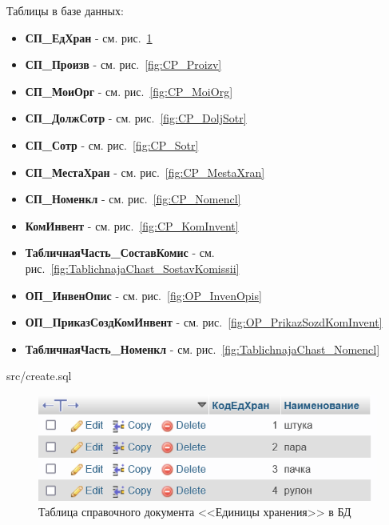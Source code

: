 \documentclass[12pt, a4paper, simple]{eskdtext}
\begin{document}
    

    \thispagestyle{plain}
    \pagestyle{plain}
    \hspace{0pt}

    Таблицы в базе данных:
    \begin{itemize}
        \item \textbf{СП\_ЕдХран} - см. рис.~\ref{fig:CP_EdXran}
        \item \textbf{СП\_Произв} - см. рис.~\ref{fig:CP_Proizv}
        \item \textbf{СП\_МоиОрг} - см. рис.~\ref{fig:CP_MoiOrg}
        \item \textbf{СП\_ДолжСотр} - см. рис.~\ref{fig:CP_DoljSotr}
        \item \textbf{СП\_Сотр} - см. рис.~\ref{fig:CP_Sotr}
        \item \textbf{СП\_МестаХран} - см. рис.~\ref{fig:CP_MestaXran}
        \item \textbf{СП\_Номенкл} - см. рис.~\ref{fig:CP_Nomencl}
        \item \textbf{КомИнвент} - см. рис.~\ref{fig:CP_KomInvent}
        \item \textbf{ТабличнаяЧасть\_СоставКомис} - см. рис.~\ref{fig:TablichnajaChast_SostavKomissii}
        \item \textbf{ОП\_ИнвенОпис} - см. рис.~\ref{fig:OP_InvenOpis}
        \item \textbf{ОП\_ПриказСоздКомИнвент} - см. рис.~\ref{fig:OP_PrikazSozdKomInvent}
        \item \textbf{ТабличнаяЧасть\_Номенкл} - см. рис.~\ref{fig:TablichnajaChast_Nomencl}
    \end{itemize}

    
        {src/create.sql}

    \begin{figure}[!h]
        \centering
        \includegraphics[width=12cm]
            {_assets/СП_ЕдХран.png}
        \caption{Таблица справочного документа <<Единицы хранения>> в БД}
        \label{fig:CP_EdXran}
    \end{figure}
\end{document}
